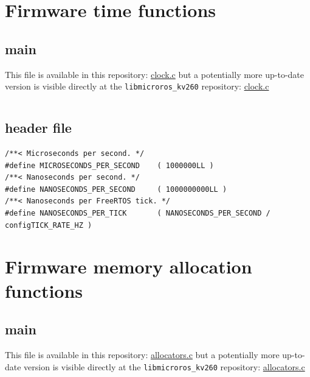 \documentclass[10pt]{article}
\begin{document}
\clearpage
\section{Firmware time functions}
\label{sec:orgf85fdcf}

\subsection{main}
\label{sec:orge7164be}
This file is available in this repository: \href{https://gitlab.com/sunoc/xilinx-kria-kv260-documentation/-/blob/b7300116e153f4b5a1542f8804e4646db8030033/src/clock.c}{clock.c}
but a potentially more up-to-date version is visible
directly at the \texttt{libmicroros\_kv260} repository: \href{https://gitlab.com/sunoc/libmicroros\_kv260/-/blob/4867e762f66af7b4647232eb4c0a31106db66e13/src/clock.c}{clock.c}

\inputminted[linenos, frame=single]{c}{./src/clock.c}

\subsection{header file}
\label{sec:org94189c6}
\begin{verbatim}
/**< Microseconds per second. */
#define MICROSECONDS_PER_SECOND    ( 1000000LL )  
/**< Nanoseconds per second. */
#define NANOSECONDS_PER_SECOND     ( 1000000000LL ) 
/**< Nanoseconds per FreeRTOS tick. */  
#define NANOSECONDS_PER_TICK       ( NANOSECONDS_PER_SECOND / configTICK_RATE_HZ ) 
\end{verbatim}


\clearpage
\section{Firmware memory allocation functions}
\label{sec:org73c29a2}

\subsection{main}
\label{sec:org111753c}
This file is available in this repository: \href{https://gitlab.com/sunoc/xilinx-kria-kv260-documentation/-/blob/b7300116e153f4b5a1542f8804e4646db8030033/src/allocators.c}{allocators.c}
but a potentially more up-to-date version is visible
directly at the \texttt{libmicroros\_kv260} repository: \href{https://gitlab.com/sunoc/libmicroros\_kv260/-/blob/4867e762f66af7b4647232eb4c0a31106db66e13/src/allocators.c}{allocators.c}
\end{document}
